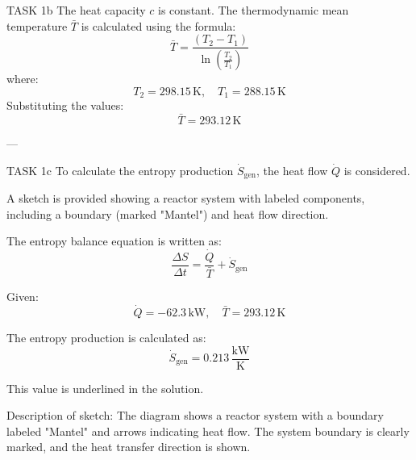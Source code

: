 TASK 1b  
The heat capacity \( c \) is constant. The thermodynamic mean temperature \( \bar{T} \) is calculated using the formula:  
\[
\bar{T} = \frac{(T_2 - T_1)}{\ln\left(\frac{T_2}{T_1}\right)}
\]  
where:  
\[
T_2 = 298.15 \, \text{K}, \quad T_1 = 288.15 \, \text{K}
\]  
Substituting the values:  
\[
\bar{T} = 293.12 \, \text{K}
\]  

---

TASK 1c  
To calculate the entropy production \( \dot{S}_{\text{gen}} \), the heat flow \( \dot{Q} \) is considered.  

A sketch is provided showing a reactor system with labeled components, including a boundary (marked "Mantel") and heat flow direction.  

The entropy balance equation is written as:  
\[
\frac{\Delta S}{\Delta t} = \frac{\dot{Q}}{\bar{T}} + \dot{S}_{\text{gen}}
\]  

Given:  
\[
\dot{Q} = -62.3 \, \text{kW}, \quad \bar{T} = 293.12 \, \text{K}
\]  

The entropy production is calculated as:  
\[
\dot{S}_{\text{gen}} = 0.213 \, \frac{\text{kW}}{\text{K}}
\]  

This value is underlined in the solution.  

Description of sketch:  
The diagram shows a reactor system with a boundary labeled "Mantel" and arrows indicating heat flow. The system boundary is clearly marked, and the heat transfer direction is shown.